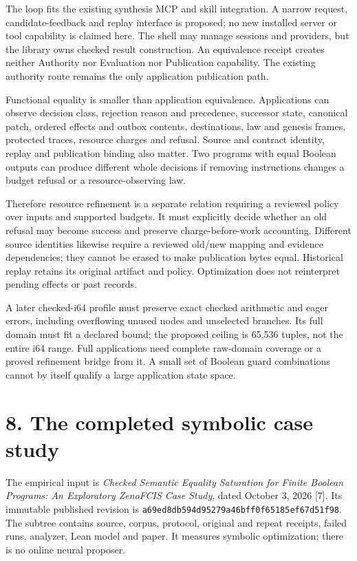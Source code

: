 \documentclass[11pt]{article}
\begin{document}
The loop fits the existing synthesis MCP and skill integration. A narrow request, candidate-feedback and replay interface is proposed; no new installed server or tool capability is claimed here. The shell may manage sessions and providers, but the library owns checked result construction. An equivalence receipt creates neither Authority nor Evaluation nor Publication capability. The existing authority route remains the only application publication path.

Functional equality is smaller than application equivalence. Applications can observe decision class, rejection reason and precedence, successor state, canonical patch, ordered effects and outbox contents, destinations, law and genesis frames, protected traces, resource charges and refusal. Source and contract identity, replay and publication binding also matter. Two programs with equal Boolean outputs can produce different whole decisions if removing instructions changes a budget refusal or a resource-observing law.

Therefore resource refinement is a separate relation requiring a reviewed policy over inputs and supported budgets. It must explicitly decide whether an old refusal may become success and preserve charge-before-work accounting. Different source identities likewise require a reviewed old/new mapping and evidence dependencies; they cannot be erased to make publication bytes equal. Historical replay retains its original artifact and policy. Optimization does not reinterpret pending effects or past records.

A later checked-i64 profile must preserve exact checked arithmetic and eager errors, including overflowing unused nodes and unselected branches. Its full domain must fit a declared bound; the proposed ceiling is 65,536 tuples, not the entire i64 range. Full applications need complete raw-domain coverage or a proved refinement bridge from it. A small set of Boolean guard combinations cannot by itself qualify a large application state space.

\section{8. The completed symbolic case study}

The empirical input is \emph{Checked Semantic Equality Saturation for Finite Boolean Programs: An Exploratory ZenoFCIS Case Study}, dated October 3, 2026 [7]. Its immutable published revision is \texttt{a69ed8db594d95279a46bff0f65185ef67d51f98}. The subtree contains source, corpus, protocol, original and repeat receipts, failed runs, analyzer, Lean model and paper. It measures symbolic optimization; there is no online neural proposer.
\end{document}
